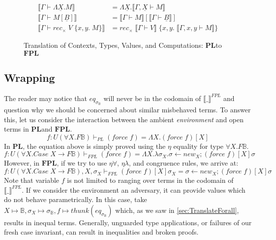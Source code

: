 \documentclass[acmsmall]{acmart}
\newcommand{\den}[1]{\llbracket #1\rrbracket}
\newcommand{\eric}[1]{\textcolor{red}{ <eric-#1> }}
\newcommand{\pl}{$\mathbf{PL}$}
\newcommand{\fpl}{$\mathbf{FPL}$}
\begin{document}
\begin{figure}[H]
\begin{minipage}[t]{0.48\textwidth}
\[\begin{aligned}
      \den{\Gamma \vdash \Lambda \underline{X}.M} &= \Lambda \underline{X}. \den{\Gamma , \underline{X} \vdash M} \\
      \den{\Gamma \vdash M[\underline{B}]} &= \den{\Gamma \vdash M}[\den{\Gamma \vdash \underline{B}}] \\
      \den{\Gamma \vdash rec_\times \;V \;\{x,y.\;M\}} &= rec_\times \;\den{\Gamma \vdash V}\;\{x,y.\; \den{\Gamma, x,y \vdash M}\}
    \end{aligned}
    \]
  \end{minipage}
  \caption{Translation of Contexts, Types, Values, and Computations: \pl to \fpl}
  \label{fig:TranslationPLFPL_merged}
\end{figure}



\subsection{Wrapping}\label{sec:Wrap}
The reader may notice that $eq_{\sigma_{\mathbb{B}}}$ will never be in the codomain of $\den{\_}^{FPL}$ and question why we should be concerned about similar misbehaved terms. To answer this, let us consider the interaction between the ambient \textit{environment} and open terms in \pl\;and \fpl.
\[
  f : U(\forall X.F \mathbb{B}) \vdash_{PL} (force\;f) = \Lambda X. (force\;f)[X]
\]
In \pl, the equation above is simply proved using the $\eta$ equality for type $\forall X. F \mathbb{B}$. 
\[
  f : U(\forall X.Case\;X \to F \mathbb{B}) \vdash_{FPL} (force\;f) = \Lambda X. \lambda \sigma_X. \sigma \leftarrow new_X;(force\;f)[X]\sigma
\]
However, in \fpl, if we try to use $\eta\forall$, $\eta\lambda$, and congruence rules, we arrive at: 
\[
  f : U(\forall X.Case\;X \to F \mathbb{B}),X,\sigma_X \vdash_{FPL} (force\;f)[X]\sigma_X = \sigma \leftarrow new_X;(force\;f)[X]\sigma
\]
Note that variable $f$ is not limited to ranging over terms in the codomain of $\den{\_}^{FPL}$. If we consider the environment an adversary, it can provide values which do not behave parametrically. In this case, take $X\mapsto \mathbb{B}, \sigma_X \mapsto \sigma_\mathbb{B}, f \mapsto thunk(eq_{\sigma_{\mathbb{B}}})$ which, as we saw in \cref{sec:TranslateForall}, results in inequal terms.
Generally, unguarded type applications, or failures of our fresh case invariant, can result in inequalities and broken proofs.
\end{document}
